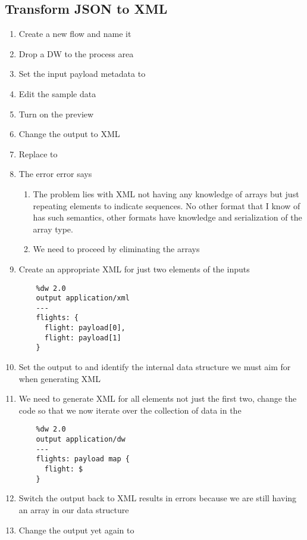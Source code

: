 \subsection{Transform JSON to XML}
\begin{enumerate}[resume*]

\item Create a new flow and name it 
\item Drop a DW to the process area
\item Set the input payload metadata to 
\item Edit the sample data
\item Turn on the preview
\item Change the output to XML
\item Replace \ttt{\{\}} to 
\item The error error says 
  \begin{enumerate}
  \item The problem lies with XML not having any knowledge of arrays but just repeating elements to indicate sequences.  No other format that I know of has such semantics, other formats have knowledge and serialization of the array type.
  \item We need to proceed by eliminating the arrays
  \end{enumerate}
\item Create an appropriate XML for just two elements of the inputs
  \lstset{language=dw}
  \begin{lstlisting}
    %dw 2.0
    output application/xml
    ---
    flights: {
      flight: payload[0],
      flight: payload[1]
    }
  \end{lstlisting}
\item Set the output to  and identify the internal data structure we must aim for when generating XML
\item We need to generate XML for all elements not just the first two, change the code so that we now iterate over the collection of data in the 
  \begin{lstlisting}
    %dw 2.0
    output application/dw
    ---
    flights: payload map {
      flight: $
    }
  \end{lstlisting}
\item Switch the output back to XML results in errors because we are still having an array in our data structure
\item Change the output yet again to 

\end{enumerate}
